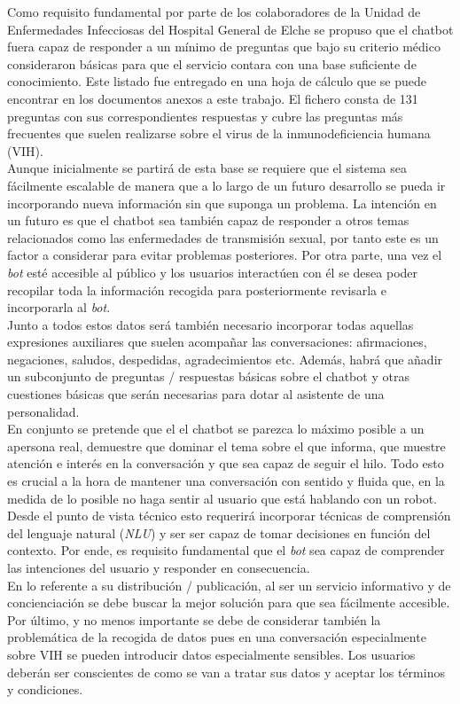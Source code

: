 Como requisito fundamental por parte de los colaboradores de la Unidad de Enfermedades Infecciosas del Hospital General de Elche se propuso que el chatbot fuera capaz de responder a un mínimo de preguntas que bajo su criterio médico consideraron básicas para que el servicio contara con una base suficiente de conocimiento. Este listado fue entregado en una hoja de cálculo que se puede encontrar en los documentos anexos a este trabajo. El fichero consta de 131 preguntas con sus correspondientes respuestas y cubre las preguntas más frecuentes que suelen realizarse sobre el virus de la inmunodeficiencia humana (VIH). \\

Aunque inicialmente se partirá de esta base se requiere que el sistema sea fácilmente escalable de manera que a lo largo de un futuro desarrollo se pueda ir incorporando nueva información sin que suponga un problema. La intención en un futuro es que el chatbot sea también capaz de responder a otros temas relacionados como las enfermedades de transmisión sexual, por tanto este es un factor a considerar para evitar problemas posteriores. Por otra parte, una vez el \textit{bot} esté accesible al público y los usuarios interactúen con él se desea poder recopilar toda la información recogida para posteriormente revisarla e incorporarla al \textit{bot}.\\

Junto a todos estos datos será también necesario incorporar todas aquellas expresiones auxiliares que suelen acompañar las conversaciones: afirmaciones, negaciones, saludos, despedidas, agradecimientos etc. Además, habrá que añadir un subconjunto de preguntas / respuestas básicas sobre el chatbot y otras cuestiones básicas que serán necesarias para dotar al asistente de una personalidad.\\

En conjunto se pretende que el el chatbot se parezca lo máximo posible a un apersona real, demuestre que dominar el tema sobre el que informa, que muestre atención e interés en la conversación y que sea capaz de seguir el hilo. Todo esto es crucial a la hora de mantener una conversación con sentido y fluida que, en la medida de lo posible no haga sentir al usuario que está hablando con un robot. Desde el punto de vista técnico esto requerirá incorporar técnicas de comprensión del lenguaje natural (\textit{NLU}) y ser ser capaz de tomar decisiones en función del contexto. Por ende, es requisito fundamental que el \textit{bot} sea capaz de comprender las intenciones del usuario y responder en consecuencia.\\

En lo referente a su distribución / publicación, al ser un servicio informativo y de concienciación se debe buscar la mejor solución para que sea fácilmente accesible. Por último, y no menos importante se debe de considerar también la problemática de la recogida de datos pues en una conversación especialmente sobre VIH se pueden introducir datos especialmente sensibles. Los usuarios deberán ser conscientes de como se van a tratar sus datos y aceptar los términos y condiciones.\\


